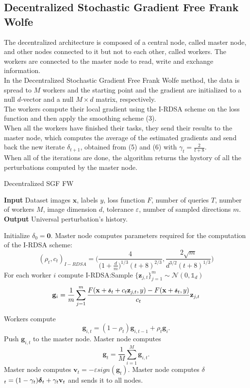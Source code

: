 \subsection{Decentralized Stochastic Gradient Free Frank Wolfe}
The decentralized architecture is composed of a central node, called master node, and other nodes connected to it but not to each other, called workers.
The workers are connected to the master node to read, write and exchange information.\\
In the Decentralized Stochastic Gradient Free Frank Wolfe method, the data is spread to $M$ workers and the starting point and the gradient are initialized to a null $d$-vector and a null $M \times d$ matrix, respectively.\\
The workers compute their local gradient using the I-RDSA scheme on the loss function and then apply the smoothing scheme (3).\\
When all the workers have finished their tasks, they send their results to the master node, which computes the average of the estimated gradients and send back the new iterate \mbox{\boldmath$ \delta$}$_{t+1}$, obtained from (5) and (6) with $\gamma_t = \frac{2}{t+8}$.\\
When all of the iterations are done, the algorithm returns the hystory of all the perturbations computed by the master node.

\begin{algorithm}
	\caption{Decentralized SGF FW}\label{decentralized} 
	 \textbf{Input} Dataset images $\mathbf{x}$, labels $y$, loss function $F$, number of queries $T$, number of workers $M$, image dimension $d$, tolerance $\varepsilon$, number of sampled directions $m$.\\
	 \textbf{Output} Universal perturbation's history.
	\begin{algorithmic}[1]		
		\State Initialize \mbox{\boldmath$ \delta$}$_{0} = \mathbf{0}$.
		\State Master node computes parameters required for the computation of the I-RDSA scheme: 
		{\scriptsize\[(\rho_t,c_t)_{I-RDSA} =\bigg(\frac{4}{\big(1+\frac{d}{m}\big)^{1/3}(t+8)^{2/3}}, \frac{2\sqrt{m}}{d^{3/2}(t+8)^{1/3}}\bigg)\]}
		\State For each worker $i$ compute I-RDSA:\newline Sample $\{\mathbf{z}_{j,t}\}_{j=1}^m \sim\mathcal{N}(0,\mathbb{1}_d)$ \newline
		 \[\mathbf{g}_i = \frac{1}{m} \sum_{j=1}^{m} \frac{F(\mathbf{x} + \mbox{\scriptsize\boldmath$ \delta$}_t + c_t\mathbf{z}_{j,t}, y) - F(\mathbf{x} + \mbox{\scriptsize\boldmath$ \delta$}_t, y)}{c_t}\mathbf{z}_{j,t}\]
		
		\State Workers compute \[\mathbf{g}_{i,t}= (1- \rho_t)\mathbf{g}_{i,t-1} + \rho_t\mathbf{g}_i.\]
		\State Push $\textbf{g}_{i,t}$ to the master node.
		\State Master node computes 
		\[\mathbf{g}_t = \frac{1}{M} \sum_{i=1}^{M} \mathbf{g}_{i,t}.\]
		\State Master node computes $\mathbf{v}_t = - \varepsilon sign(\mathbf{g}_t)$.
		\State Master node computes \mbox{\boldmath$ \delta$}$_t = (1-\gamma_t)\mbox{\boldmath$ \delta$}_t + \gamma_t\mathbf{v}_t$ and sends it to all nodes.
		\EndFor

	\end{algorithmic}
\end{algorithm}
